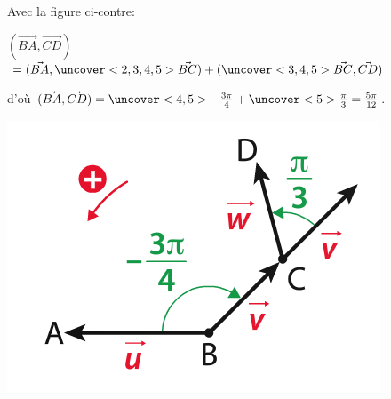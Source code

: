 \documentclass{beamer}
\theoremstyle{plain}
\begin{document}
 \begin{frame}

 \begin{example}
 \begin{multicols}{2} 
 
  Avec la figure ci-contre:   
  
   $(\vec{BA},\vec{CD})$
   $=(\vec{BA},\uncover<2,3,4,5>{\vec{BC}})+(\uncover<3,4,5>{\vec{BC}},\vec{CD})$
   
   d'où $(\vec{BA},\vec{CD})=\uncover<4,5>{-\frac{3\pi}{4}}+\uncover<5>{\frac{\pi}{3}}=\frac{5\pi}{12}$.
   
   \columnbreak 
   \includegraphics[scale=0.5]{../Images/relChasles.png}
  \end{multicols}

 \end{example}
 \end{frame}
 
\end{document}
